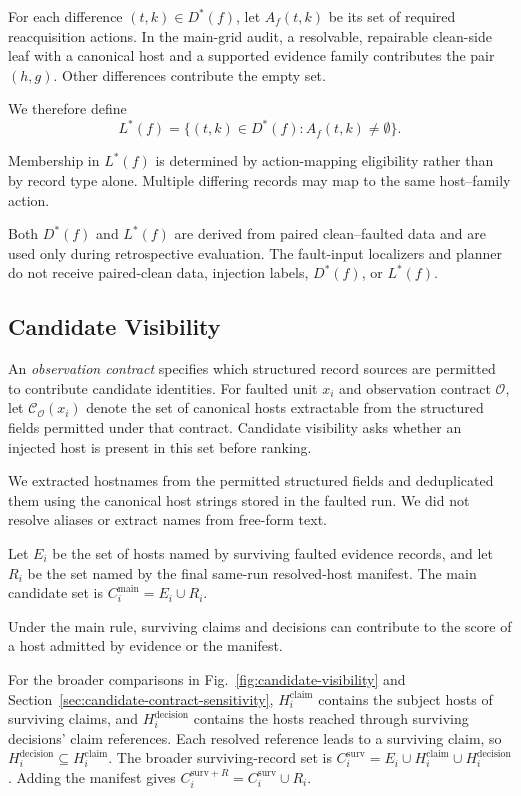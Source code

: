 \documentclass[sn-basic]{sn-jnl}%
\theoremstyle{thmstyleone}%
\theoremstyle{thmstyletwo}%
\theoremstyle{thmstylethree}%
\begin{document}
For each difference \((t,k) \in D^{*}(f)\), let \(A_f(t,k)\) be its set of required reacquisition actions. In the main-grid audit, a resolvable, repairable clean-side leaf with a canonical host and a supported evidence family contributes the pair \((h,g)\). Other differences contribute the empty set.

We therefore define
\[
L^{*}(f) =
\bigl\{ (t,k) \in D^{*}(f) : A_f(t,k) \ne \emptyset \bigr\}.
\]

Membership in \(L^{*}(f)\) is determined by action-mapping eligibility rather than by record type alone. Multiple differing records may map to the same host--family action.

Both \(D^{*}(f)\) and \(L^{*}(f)\) are derived from paired clean--faulted data and are used only during retrospective evaluation. The fault-input localizers and planner do not receive paired-clean data, injection labels, \(D^{*}(f)\), or \(L^{*}(f)\).

\subsection{Candidate Visibility}\label{sec:candidate-visibility}

An \emph{observation contract} specifies which structured record sources are permitted to contribute candidate identities. For faulted unit \(x_i\) and observation contract \(\mathcal{O}\), let \(\mathcal{C}_{\mathcal{O}}(x_i)\) denote the set of canonical hosts extractable from the structured fields permitted under that contract. Candidate visibility asks whether an injected host is present in this set before ranking.

We extracted hostnames from the permitted structured fields and deduplicated them using the canonical host strings stored in the faulted run. We did not resolve aliases or extract names from free-form text.

Let \(E_i\) be the set of hosts named by surviving faulted evidence records, and let \(R_i\) be the set named by the final same-run resolved-host manifest. The main candidate set is \(C_i^{\mathrm{main}} = E_i \cup R_i\).

Under the main rule, surviving claims and decisions can contribute to the score of a host admitted by evidence or the manifest.

For the broader comparisons in Fig.~\ref{fig:candidate-visibility} and Section~\ref{sec:candidate-contract-sensitivity}, \(H_i^{\mathrm{claim}}\) contains the subject hosts of surviving claims, and \(H_i^{\mathrm{decision}}\) contains the hosts reached through surviving decisions' claim references. Each resolved reference leads to a surviving claim, so \(H_i^{\mathrm{decision}} \subseteq H_i^{\mathrm{claim}}\). The broader surviving-record set is \(C_i^{\mathrm{surv}} = E_i \cup H_i^{\mathrm{claim}} \cup H_i^{\mathrm{decision}}\). Adding the manifest gives \(C_i^{\mathrm{surv}+R} = C_i^{\mathrm{surv}} \cup R_i\).
\end{document}
